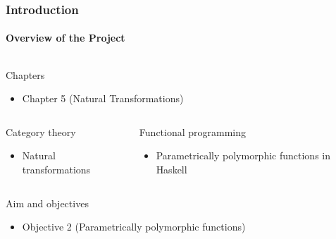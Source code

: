 \documentclass{beamer}
\begin{document}

\begin{frame}[label={chap:naturals}]
  \frametitle{Introduction}
  \framesubtitle{Overview of the Project}

  \begin{columns}[onlytextwidth,t]
    \begin{column}{\textwidth}
      \begin{block}{Chapters}
        \begin{itemize}
        \item Chapter 5 (Natural Transformations)
        \end{itemize}
      \end{block}
    \end{column}
  \end{columns}
  \begin{columns}[onlytextwidth,t]
    \begin{column}{.5\textwidth}
      \begin{block}{Category theory}
        \begin{itemize}
        \item Natural transformations
        \end{itemize}
      \end{block}
    \end{column}
    \begin{column}{.5\textwidth}
      \begin{block}{Functional programming}
        \begin{itemize}
        \item Parametrically polymorphic functions in Haskell
        \end{itemize}
      \end{block}
    \end{column}
  \end{columns}
  \begin{columns}[onlytextwidth,t]
    \begin{column}{\textwidth}
      \begin{block}{Aim and objectives}
        \begin{itemize}
        \item Objective 2 (Parametrically polymorphic functions)
        \end{itemize}
      \end{block}
    \end{column}
  \end{columns}

\end{frame}
\end{document}
